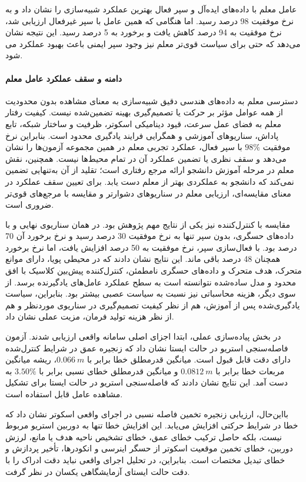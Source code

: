 عامل معلم با داده‌های ایده‌آل و سپر فعال بهترین عملکرد شبیه‌سازی را نشان داد و به نرخ موفقیت 98 درصد رسید. اما هنگامی که همین عامل با سپر غیرفعال ارزیابی شد، نرخ موفقیت به 94 درصد کاهش یافت و برخورد به 5 درصد رسید. این نتیجه نشان می‌دهد که حتی برای سیاست قوی‌تر معلم نیز وجود سپر ایمنی باعث بهبود عملکرد می شود.
\paragraph{دامنه و سقف عملکرد عامل معلم}
دسترسی معلم به داده‌های هندسی دقیق شبیه‌سازی به معنای مشاهده بدون محدودیت از همه عوامل مؤثر بر حرکت یا تصمیم‌گیری بهینه تضمین‌شده نیست. کیفیت رفتار معلم به فضای عمل سرعت، قیود دینامیکی اسکوتر، ظرفیت و ساختار شبکه، تابع پاداش، سناریوهای آموزشی و همگرایی فرایند یادگیری محدود است. بنابراین نرخ موفقیت $98\%$ با سپر فعال، عملکرد تجربی معلم در همین مجموعه آزمون‌ها را نشان می‌دهد و سقف نظری یا تضمین عملکرد آن در تمام محیط‌ها نیست. همچنین، نقش معلم در مرحله آموزش دانشجو ارائه مرجع رفتاری است؛ تقلید از آن به‌تنهایی تضمین نمی‌کند که دانشجو به عملکردی بهتر از معلم دست یابد. برای تعیین سقف عملکرد در معنای مقایسه‌ای، ارزیابی معلم در سناریوهای دشوارتر و مقایسه با مرجع‌های قوی‌تر ضروری است.


مقایسه با کنترل‌کننده  نیز یکی از نتایج مهم پژوهش بود. در همان سناریوی نهایی و با داده‌های حسگری،  بدون سپر تنها به نرخ موفقیت 30 درصد رسید و نرخ برخورد آن 70 درصد بود. با فعال‌سازی سپر، نرخ موفقیت  به 50 درصد افزایش یافت، اما نرخ برخورد همچنان 48 درصد باقی ماند. این نتایج نشان دادند که در محیطی پویا، دارای موانع متحرک، هدف متحرک و داده‌های حسگری نامطمئن، کنترل‌کننده پیش‌بین کلاسیک با افق محدود و مدل ساده‌شده نتوانسته است به سطح عملکرد عامل‌های یادگیرنده برسد. از سوی دیگر، هزینه محاسباتی  نیز نسبت به سیاست عصبی بیشتر بود. بنابراین، سیاست یادگیری‌شده پس از آموزش، هم از نظر کیفیت تصمیم‌گیری در سناریوی موردنظر و هم از نظر هزینه تولید فرمان، مزیت عملی نشان داد.

در بخش پیاده‌سازی عملی، ابتدا اجزای اصلی سامانه واقعی ارزیابی شدند. آزمون فاصله‌سنجی استریو در حالت ایستا نشان داد که زنجیره عمق در شرایط کنترل‌شده دارای دقت قابل قبول است. میانگین قدرمطلق خطا برابر با $0.066~m$، ریشه میانگین مربعات خطا برابر با $0.0812~m$ و میانگین قدرمطلق خطای نسبی برابر با $3.50\%$ به دست آمد. این نتایج نشان دادند که فاصله‌سنجی استریو در حالت ایستا برای تشکیل مشاهده عامل قابل استفاده است.

بااین‌حال، ارزیابی زنجیره تخمین فاصله نسبی در اجرای واقعی اسکوتر نشان داد که خطا در شرایط حرکتی افزایش می‌یابد. این افزایش خطا تنها به دوربین استریو مربوط نیست، بلکه حاصل ترکیب خطای عمق، خطای تشخیص ناحیه هدف یا مانع، لرزش دوربین، خطای تخمین موقعیت اسکوتر از حسگر اینرسی و انکودرها، تأخیر پردازش و خطای تبدیل مختصات است. بنابراین، در تحلیل اجرای واقعی نباید دقت ادراک را با دقت حالت ایستای آزمایشگاهی یکسان در نظر گرفت.

